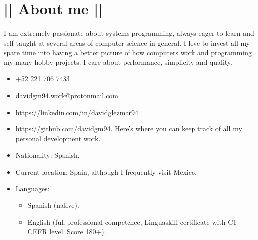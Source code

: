 \section*{|| About me ||}
\paragraph{}I am extremely passionate about systems programming, always eager to learn and self-taught at several areas of computer science in general. I love to invest all my spare time into having a better picture of how computers work and programming my many hobby projects. I care about performance, simplicity and quality.

\begin{itemize}
	\item[] \faPhone \space +52 221 706 7433
	\item[] \faMailReply \space \href{mailto:davidgm94.work@protonmail.com}{davidgm94.work@protonmail.com}
	\item[] \faLinkedin \space \href{https://linkedin.com/in/davidglezmar94}{https://linkedin.com/in/davidglezmar94}
	\item[] \faGithub \space \href{https://github.com/davidgm94}{https://github.com/davidgm94}. Here's where you can keep track of all my personal development work.
	\item[] Nationality: Spanish.
	\item[] Current location: Spain, although I frequently visit Mexico.
	\item[] Languages:
	\begin{itemize}
		\item Spanish (native).
		\item English (full professional competence, Linguaskill certificate with C1 CEFR level. Score 180+).
	\end{itemize}
\end{itemize}
